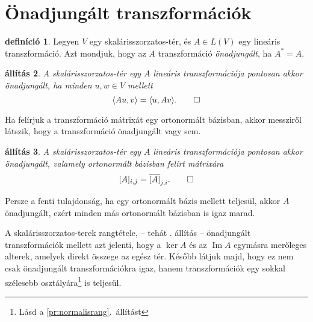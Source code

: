 \documentclass[a4paper, showtrims]{memoir}
\theoremstyle{plain}
\newtheorem{proposition}{állítás}[chapter]
\theoremstyle{remark}
\theoremstyle{definition}
\newtheorem{definition}[proposition]{definíció}
\DeclareMathOperator{\im}{Im}
\newcommand{\ip}[2]{\langle#1,#2\rangle}
\begin{document}
\section{Önadjungált transzformációk}
\begin{definition}
	Legyen $V$ egy skalárisszorzatos-tér, és $A\in L\left( V \right)$ egy lineáris transzformáció.
	Azt mondjuk, hogy az $A$ transzformáció
	\emph{önadjungált},
	ha $A^\ast=A$.
\end{definition}

\begin{proposition}
	A skalárisszorzatos-tér egy $A$ lineáris transzformációja pontosan akkor önadjungált,
	ha minden $u,w\in V$ mellett
	\[
		\ip{Au}{v}
		=
		\ip{u}{Av}.
		\qedhere
	\]
\end{proposition}
Ha felírjuk a transzformáció mátrixát egy ortonormált bázisban, akkor messziről látszik,
hogy a transzformáció önadjungált vagy sem.
\begin{proposition}
	A skalárisszorzatos-tér egy $A$ lineáris transzformációja pontosan akkor önadjungált,
	valamely ortonormált bázisban felírt mátrixára
	\[
		[A]_{i,j}=\overline{[A]}_{j,i}.
		\qedhere
	\]
\end{proposition}
Persze a fenti tulajdonság, ha egy ortonormált bázis mellett teljesül,
akkor $A$ önadjungált, ezért minden más ortonormált bázisban is igaz marad.

A skalárisszorzatos-terek rangtétele, -- tehát . állítás -- önadjungált transzformációk mellett azt jelenti,
hogy
a $\ker A$ és az $\im A$ egymásra merőleges alterek,
amelyek direkt összege az egész tér.
Később látjuk majd, hogy ez nem csak önadjungált transzformációkra igaz,
hanem transzformációk egy sokkal szélesebb osztályára\footnote{Lásd a \ref{pr:normalisrang}.~állítást} is teljesül.
\end{document}

